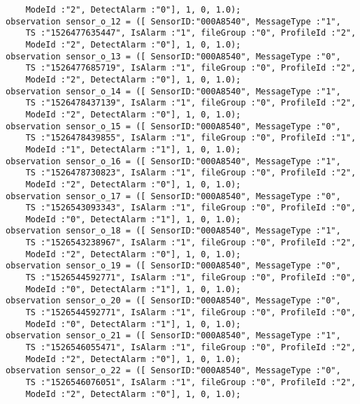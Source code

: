 \documentclass{easychair}
\begin{document}
\begin{lstlisting}
	ModeId :"2", DetectAlarm :"0"], 1, 0, 1.0);
observation sensor_o_12 = ([ SensorID:"000A8540", MessageType :"1",
	TS :"1526477635447", IsAlarm :"1", fileGroup :"0", ProfileId :"2",
	ModeId :"2", DetectAlarm :"0"], 1, 0, 1.0);
observation sensor_o_13 = ([ SensorID:"000A8540", MessageType :"0",
	TS :"1526477685719", IsAlarm :"1", fileGroup :"0", ProfileId :"2",
	ModeId :"2", DetectAlarm :"0"], 1, 0, 1.0);
observation sensor_o_14 = ([ SensorID:"000A8540", MessageType :"1",
	TS :"1526478437139", IsAlarm :"1", fileGroup :"0", ProfileId :"2",
	ModeId :"2", DetectAlarm :"0"], 1, 0, 1.0);
observation sensor_o_15 = ([ SensorID:"000A8540", MessageType :"0",
	TS :"1526478439855", IsAlarm :"1", fileGroup :"0", ProfileId :"1",
	ModeId :"1", DetectAlarm :"1"], 1, 0, 1.0);
observation sensor_o_16 = ([ SensorID:"000A8540", MessageType :"1",
	TS :"1526478730823", IsAlarm :"1", fileGroup :"0", ProfileId :"2",
	ModeId :"2", DetectAlarm :"0"], 1, 0, 1.0);
observation sensor_o_17 = ([ SensorID:"000A8540", MessageType :"0",
	TS :"1526543093343", IsAlarm :"1", fileGroup :"0", ProfileId :"0",
	ModeId :"0", DetectAlarm :"1"], 1, 0, 1.0);
observation sensor_o_18 = ([ SensorID:"000A8540", MessageType :"1",
	TS :"1526543238967", IsAlarm :"1", fileGroup :"0", ProfileId :"2",
	ModeId :"2", DetectAlarm :"0"], 1, 0, 1.0);
observation sensor_o_19 = ([ SensorID:"000A8540", MessageType :"0",
	TS :"1526544592771", IsAlarm :"1", fileGroup :"0", ProfileId :"0",
	ModeId :"0", DetectAlarm :"1"], 1, 0, 1.0);
observation sensor_o_20 = ([ SensorID:"000A8540", MessageType :"0",
	TS :"1526544592771", IsAlarm :"1", fileGroup :"0", ProfileId :"0",
	ModeId :"0", DetectAlarm :"1"], 1, 0, 1.0);
observation sensor_o_21 = ([ SensorID:"000A8540", MessageType :"1",
	TS :"1526546055471", IsAlarm :"1", fileGroup :"0", ProfileId :"2",
	ModeId :"2", DetectAlarm :"0"], 1, 0, 1.0);
observation sensor_o_22 = ([ SensorID:"000A8540", MessageType :"0",
	TS :"1526546076051", IsAlarm :"1", fileGroup :"0", ProfileId :"2",
	ModeId :"2", DetectAlarm :"0"], 1, 0, 1.0);

\end{lstlisting}
\end{document}
